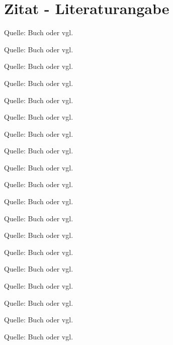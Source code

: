 \section{Zitat - Literaturangabe}\label{zitat---literaturangabe}

Quelle: Buch oder
vgl.~\cite{monk_raspberry:2014}

Quelle: Buch oder
vgl.~\cite{monk_elektronik_hacks:2013}

Quelle: Buch oder
vgl.~\cite{monk_action_buch:2016}

Quelle: Buch oder
vgl.~\cite{weigend_raspberry:2016}

Quelle: Buch oder
vgl.~\cite{weigend_python:2018}

Quelle: Buch oder
vgl.~\cite{bosch_training:2018}

Quelle: Buch oder
vgl.~\cite{schlosser_latex:2016}

Quelle: Buch oder
vgl.~\cite{homofaciens_projekt:2018}

Quelle: Buch oder
vgl.~\cite{frei_kfzelektrik:2013}

Quelle: Buch oder
vgl.~\cite{bartmann:2018}

Quelle: Buch oder
vgl.~\cite{bartmann_arduino:2017}

Quelle: Buch oder
vgl.~\cite{joos_windows:2018}

Quelle: Buch oder
vgl.~\cite{joos_win7:2012}

Quelle: Buch oder
vgl.~\cite{kofler:2018}

Quelle: Buch oder
vgl.~\cite{kofler_raspberry:2015}

Quelle: Buch oder
vgl.~\cite{kofler_linux:2017}

Quelle: Buch oder
vgl.~\cite{kofler_hacking:2018}

Quelle: Buch oder
vgl.~\cite{kofler_shellbefehle:2016}

Quelle: Buch oder
vgl.~\cite{kuveler_inf:2009}

